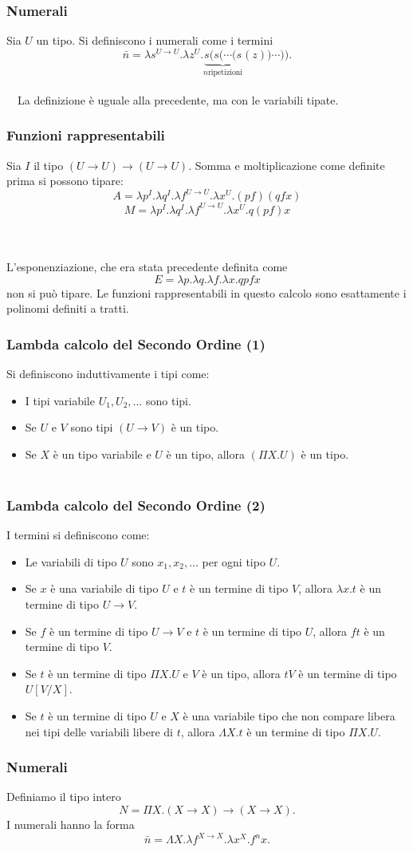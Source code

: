 \documentclass{beamer}
\renewcommand{\l}{\lambda}
\renewcommand{\L}{\Lambda}
\newcommand{\ar}{\rightarrow}
\begin{document}
\begin{frame}
    \frametitle{Numerali}
    Sia $U$ un tipo. Si definiscono i numerali come i termini
    \[
        \bar{n} = \l s^{U\ar U}. \l z^{U}. \underbrace{s ( s ( \cdots (s}_{n\text{
            ripetizioni}} (z))\cdots )).
    \]
    \\~\
    La definizione \`e uguale alla precedente, ma con le variabili tipate.
\end{frame}


\begin{frame}
    \frametitle{Funzioni rappresentabili}

    Sia $I$ il tipo $(U\ar U)\ar (U\ar U)$.
    Somma e moltiplicazione come definite prima si possono tipare:
    \[
        A = \l p^I. \l q^I. \l f^{U\ar U}. \l x^U. (pf)(qfx)
    \]
    \[
            M = \l p^I. \l q^I. \l f^{U\ar U}. \l x^U. q(pf)x
    \]
    \\~\
    
    L'esponenziazione, che era stata precedente definita come
    \[
        E = \l p. \l q. \l f. \l x. qpfx
    \]
    non si pu\`o tipare. Le funzioni rappresentabili in questo calcolo sono
    esattamente i polinomi definiti a tratti.
\end{frame}

\begin{frame} 
    \frametitle{Lambda calcolo del Secondo Ordine (1)}
    Si definiscono induttivamente i tipi come:
    \begin{itemize}
        \item I tipi variabile $U_1, U_2, \dots$ sono tipi.
        \item Se $U$ e $V$ sono tipi $(U\ar V)$ \`e un tipo.
        \item Se $X$ \`e un tipo variabile e $U$ \`e un tipo, allora $(\Pi X.U)$
            \`e un tipo.
    \\~\
    \end{itemize}
\end{frame} 

\begin{frame} 
    \frametitle{Lambda calcolo del Secondo Ordine (2)}
    I termini si definiscono come:
    \begin{itemize}
        \item Le variabili di tipo $U$ sono $x_1, x_2, \dots$ per ogni tipo $U$.
        \item Se $x$ \`e una variabile di tipo $U$ e $t$ \`e un termine di tipo
            $V$, allora $\l x. t$ \`e un termine di tipo $U\ar V$.
        \item Se $f$ \`e un termine di tipo $U\ar V$ e $t$ \`e un termine di
            tipo $U$, allora $ft$ \`e un termine di tipo $V$.
        \item Se $t$ \`e un termine di tipo $\Pi X. U$ e $V$ \`e un tipo, allora
            $tV$ \`e un termine di tipo $U[V/X]$.
        \item Se $t$ \`e un termine di tipo $U$ e $X$ \`e una variabile tipo che
            non compare libera nei tipi delle variabili libere di $t$, allora
            $\L X. t$ \`e un termine di tipo $\Pi X. U$.
    \end{itemize}
\end{frame} 

\begin{frame}
    \frametitle{Numerali}
    Definiamo il tipo intero
    \[
        N = \Pi X. (X\ar X)\ar (X\ar X).
    \]
    I numerali hanno la forma
    \[
        \bar{n} = \L X. \l f^{X\ar X}. \l x^X. f^nx.
    \]
\end{frame}
\end{document}

